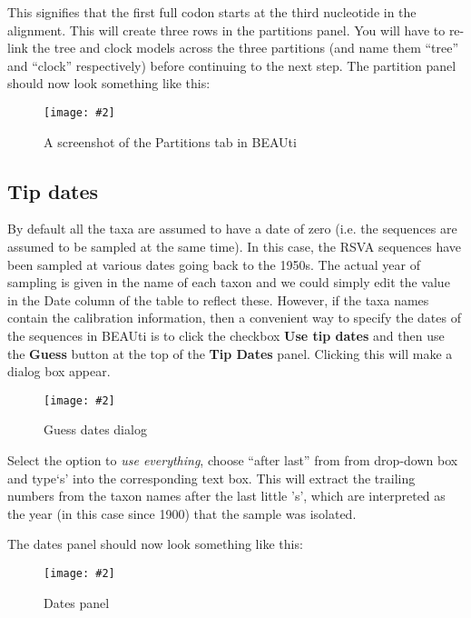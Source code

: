 \documentclass[12pt]{article}
\newcommand{\includeimage}[2][]{%
\texttt{[image: \#2]}
}
\begin{document}
This signifies that the first full codon starts at the third nucleotide in the alignment. This will create three rows in the partitions panel. You will have to re-link the tree and clock models across the three partitions (and name them ``tree'' and ``clock'' respectively) before continuing to the next step. The partition panel should now look something like this:

\begin{figure}
\centering	
\includeimage[width=0.8\textwidth]{figures/BEAUti_partition}
\label{fig:BEAUti_partition}
\caption{A screenshot of the Partitions tab in BEAUti}
\end{figure}

\subsection*{Tip dates}
By default all the taxa are assumed to have a date of zero (i.e. the sequences are assumed to be sampled at the same time).
In this case, the RSVA sequences have been sampled at various dates going back to the 1950s. The actual year of sampling
is given in the name of each taxon and we could simply edit the value in the Date column of the table to reflect these.
However, if the taxa names contain the calibration information, then a convenient way to specify the dates of the sequences
in BEAUti is to click the checkbox {\bf Use tip dates} and then use the {\bf Guess} button at the top of the {\bf Tip Dates} panel. Clicking this will make a dialog box appear.

\begin{figure}
\centering	
\includeimage[width=0.6\textwidth]{figures/BEAUti_GuessDates}
\label{fig:BEAUti_GuessDates}
\caption{Guess dates dialog}
\end{figure}


Select the option to {\it use everything}, choose ``after last'' from from drop-down box and type`s' into the corresponding text box. This will extract the trailing numbers from the taxon names after the last little 's', which are interpreted as the year (in this case since 1900) that the sample was isolated.

The dates panel should now look something like this:

\begin{figure}
\centering	
\includeimage[width=0.8\textwidth]{figures/BEAUti_dates}
\label{fig:BEAUti_dates}
\caption{Dates panel}
\end{figure}
\end{document}
